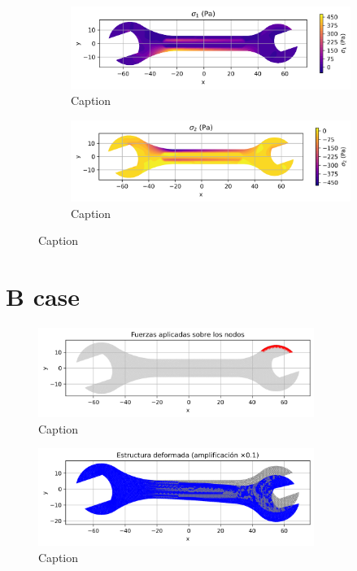 \begin{figure}[H]
  \centering
  \begin{subfigure}[t]{0.49\textwidth}
    \centering
    \includegraphics[width=\textwidth]{GRAFICOS/Case a - sigma_1.png}
    \caption{Caption}
    \label{fig:deformada_reacciones}
  \end{subfigure}
  \hfill
  \begin{subfigure}[t]{0.49\textwidth}
    \centering
    \includegraphics[width=\textwidth]{GRAFICOS/Case a - sigma_2.png}
    \caption{Caption}
    \label{fig:von_mises}
  \end{subfigure}
  \caption{Caption}
  \label{fig:analisis_estructural}
\end{figure}



\section{B case}

\begin{figure}[H]
  \centering
  \includegraphics[width=0.8\textwidth]{GRAFICOS/Case b_fuerzas.png}
  \caption{Caption}
  \label{fig:strain}
\end{figure}

\begin{figure}[H]
  \centering
  \includegraphics[width=0.8\textwidth]{GRAFICOS/Case b_deformada.png}
  \caption{Caption}
  \label{fig:stress}
\end{figure}

